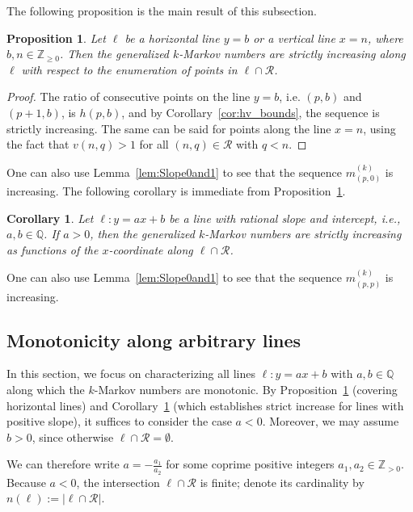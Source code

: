 \documentclass{article}
\newtheorem{cor}[theorem]{Corollary}
\newtheorem{prop}[theorem]{Proposition}
\theoremstyle{remark}
\begin{document}
The following proposition is the main result of this subsection.

\begin{prop}\label{prop:monotonicity_hv}
Let $\ell$ be a horizontal line $y = b$ or a vertical line $x = n$, where $b,n \in \mathbb{Z}_{\geq 0}$.  
Then the generalized $k$-Markov numbers are strictly increasing along $\ell$ with respect to the enumeration of points in $\ell \cap \mathcal{R}$.
\end{prop}

\begin{proof}
The ratio of consecutive points on the line $y = b$, i.e.  $(p,b)$ and $(p+1,b)$, is $h(p,b)$, and by Corollary~\ref{cor:hv_bounds}, the sequence is strictly increasing. The same can be said for points along the line $x = n$, using the fact that $v(n,q) > 1$ for all $(n,q) \in \mathcal{R}$ with $q < n$.
\end{proof}

One can also use Lemma~\ref{lem:Slope0and1} to see that the sequence $m^{(k)}_{(p,0)}$ is increasing.
The following corollary is immediate from Proposition~\ref{prop:monotonicity_hv}. 

\begin{cor}\label{cor:positiveslope}
Let $\ell: y = ax + b$ be a line with rational slope and intercept, i.e., $a, b \in \mathbb{Q}$.  
If $a > 0$, then the generalized $k$-Markov numbers are strictly increasing as functions of the $x$-coordinate along $\ell \cap \mathcal{R}$.
\end{cor}

One can also use Lemma~\ref{lem:Slope0and1} to see that the sequence $m^{(k)}_{(p,p)}$ is increasing.

\subsection{Monotonicity along arbitrary lines}

In this section, we focus on characterizing all lines $\ell: y = ax + b$  with $a,b \in \mathbb{Q}$ along which the $k$-Markov numbers are monotonic.
By Proposition~\ref{prop:monotonicity_hv} (covering horizontal lines) and Corollary~\ref{cor:positiveslope} (which establishes strict increase for lines with positive slope), it suffices to consider the case $a < 0$.  
Moreover, we may assume $b > 0$, since otherwise $\ell \cap \mathcal{R} = \emptyset$.  

We can therefore write $a = -\frac{a_1}{a_2}$ for some coprime positive integers $a_1, a_2 \in \mathbb{Z}_{>0}$.  
Because $a < 0$, the intersection $\ell \cap \mathcal{R}$ is finite; denote its cardinality by $n(\ell) := |\ell \cap \mathcal{R}|.$
\end{document}
